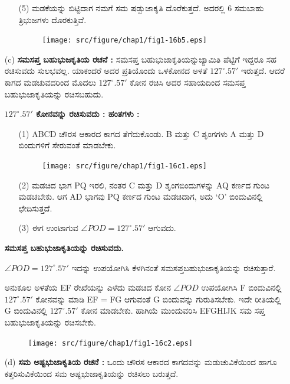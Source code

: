 \begin{itemize}
\begin{enumerate}
\item[(5)] ಮಡಕೆಯನ್ನು ಬಿಟ್ಟಿದಾಗ ನಮಗೆ ಸಮ ಷಡ್ಬುಜಾಕೃತಿ ದೊರೆಕುತ್ತದೆ. ಅದರಲ್ಲಿ 6 ಸಮಬಾಹು ತ್ರಿಭುಜಗಳು ದೊರಕುತ್ತಿವೆ. 
\begin{figure}[H]
\centering
\texttt{[image: src/figure/chap1/fig1-16b5.eps]}
\end{figure}
\end{enumerate}

\item[(c)]  \textbf{ಸಮಸಪ್ತ ಬಹುಭುಜಕೃತಿಯ ರಚನೆ :} ಸಮಸಪ್ತ ಬಹುಭುಜಾಕೃತಿಯನ್ನು\break ಜ್ಯಾಮಿತಿ ಪೆಟ್ಟಿಗೆ ಇದ್ದರೂ ಸಹ ರಚಿಸುವದು ಸುಲಭವಲ್ಲ. ಯಾಕಂದರೆ ಅದರ ಪ್ರತಿ\-ಯೊಂದು ಒಳಕೋನದ ಅಳತೆ $127^\circ.57'$ ಇರುತ್ತದೆ. ಆದರೆ ಕಾಗದ ಮಡಚುವದರಿಂದ ಮೊದಲು $127^\circ.57'$ ಕೋನ ರಚಿಸಿ ಅದರ ಸಹಾಯದಿಂದ ಸಮಸಪ್ತ ಬಹು\break ಭುಜಾಕೃತಿಯನ್ನು ರಚಿಸಬಹುದು. 

\noindent
\textbf{$127^\circ.57'$ ಕೋನವನ್ನು ರಚಿಸುವದು : ಹಂತಗಳು :}
\begin{enumerate}
\item[(1)] ABCD ಚೌರಸ ಆಕಾರದ ಕಾಗದ ತೆಗೆದುಕೊಂಡು. B ಮತ್ತು C ಶೃಂಗಗಳು A ಮತ್ತು D ಬಿಂದುಗಳಿಗೆ ಸೇರುವಂತೆ ಮಾಡಬೇಕು.
 \begin{figure}[H]
\centering
\texttt{[image: src/figure/chap1/fig1-16c1.eps]}
\end{figure}

\item[(2)] ಮಡಚಿದ ಭಾಗ PQ ಇರಲಿ, ನಂತರ C ಮತ್ತು D ಶೃಂಗಬಿಂದುಗಳನ್ನು AQ ಕರ್ಣದ ಗುಂಟ ಮಡಚಬೇಕು. ಆಗ AD ಭಾಗವು  PQ ಕರ್ಣದ ಗುಂಟ ಮಡಚಿದಾಗ, ಅದು `O' ಬಿಂದುವಿನಲ್ಲಿ ಛೇದಿಸುತ್ತದೆ. 
 
\item[(3)] ಈಗ ಉಂಟಾಗುವ $\angle POD = 127^\circ.57'$ ಆಗುವದು. 
\end{enumerate}

\medskip
\noindent
\textbf{ಸಮಸಪ್ತ ಬಹುಭುಜಾಕೃತಿಯನ್ನು ರಚಿಸುವದು.}

$\angle POD =127^\circ .57'$ ಇದನ್ನು ಉಪಯೋಗಿಸಿ ಕೆಳಗಿನಂತೆ ಸಮಸಪ್ತಬಹುಭುಜಾಕೃತಿಯನ್ನು ರಚಿಸುತ್ತಾರೆ. 

ಅನುಕೂಲ ಅಳತೆಯ EF ರೇಖೆಯನ್ನು ಎಳೆದು ಮಡಚಿದ ಕೋನ $\angle POD$ ಉಪಯೋಗಿಸಿ F ಬಿಂದುವಿನಲ್ಲಿ  $127^\circ .57'$ ಕೋನವನ್ನು ಮಾಡಿ  EF = FG ಆಗುವಂತೆ G ಬಿಂದುವನ್ನು ಗುರುತಿಸಬೇಕು.  ಇದೇ ರೀತಿಯಲ್ಲಿ G ಬಿಂದುವಿನಲ್ಲಿ $127^\circ .57'$ ಕೋನ ಮಾಡಬೇಕು. ಹಾಗಿಯೆ ಮುಂದುವರಿಸಿ EFGHIJK ಸಮ ಸಪ್ತ ಬಹುಭುಜಾಕೃತಿಯನ್ನು ರಚಿಸಬೇಕು.
\begin{figure}[H]
\centering
\texttt{[image: src/figure/chap1/fig1-16c2.eps]}\\
\end{figure}
 
 
\item[(d)] \textbf{ಸಮ ಅಷ್ಟಭುಜಾಕೃತಿಯ ರಚನೆ :} ಒಂದು ಚೌರಸ ಆಕಾರದ ಕಾಗದವನ್ನು ಮಡುಚುವಿಕೆಯಿಂದ ಹಾಗೂ ಕತ್ತರಿಸುವಿಕೆಯಿಂದ ಸಮ ಅಷ್ಟಭುಜಾಕೃತಿಯನ್ನು ರಚಿಸಲು ಬರುತ್ತದೆ. 
\end{itemize}

